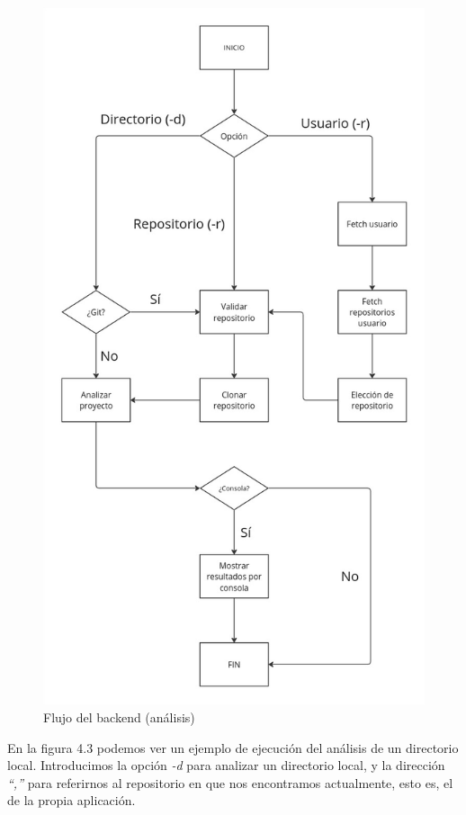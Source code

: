 \documentclass[a4paper, 12pt]{book}
\begin{document}
\begin{figure}[H]
  \centering
  \includegraphics[height=\textheight, keepaspectratio]{img/esquema_backend_final.jpg}
  \caption{Flujo del backend (análisis)}
  \label{fig:execution_local}
\end{figure}

En la figura 4.3 podemos ver un ejemplo de ejecución del análisis de un directorio local. Introducimos la opción \textit{-d} para analizar un directorio local, y la dirección \textit{``,''} para referirnos al repositorio en que nos encontramos actualmente, esto es, el de la propia aplicación. 
\end{document}
